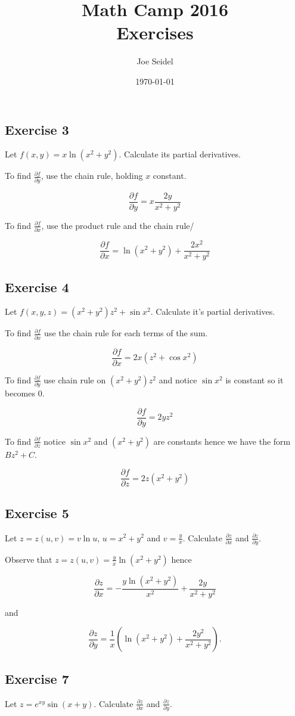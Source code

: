 \documentclass{tufte-book}
\title{Math Camp 2016\\Exercises }
\author{Joe Seidel}
\date{\today}
\newcommand{\pdv}[2]{\frac{\partial #1}{\partial #2}}
\theoremstyle{mytheoremstyle}
\theoremstyle{mylemstyle}
\theoremstyle{mydefstyle}
\begin{document}
\maketitle
{}
\newpage
{}

\subsection{Exercise 3}
Let $f(x,y) = x \ln(x^2 + y^2)$.  Calculate its partial derivatives.

To find $\pdv{f}{y}$, use the chain rule, holding $x$ constant.

\[ \pdv{f}{y} = x \frac{2y}{x^2 + y^2} \]

To find $\pdv{f}{x}$, use the product rule and the chain rule/

\[ \pdv{f}{x} = \ln(x^2+y^2) + \frac{2x^2}{x^2+y^2} \]

\subsection{Exercise 4}
Let $f(x,y,z) = (x^2 + y^2)z^2 + \sin x^2$.  Calculate it's partial derivatives.

To find $\pdv{f}{x}$ use the chain rule for each terms of the sum.

\[ \pdv{f}{x} = 2x(z^2 + \cos x^2) \]

To find $\pdv{f}{y}$ use chain rule on $(x^2+y^2)z^2$ and notice $\sin x^2$ is constant so it becomes $0$.

\[ \pdv{f}{y} = 2yz^2 \]

To find $\pdv{f}{z}$ notice $\sin x^2$ and $(x^2 + y^2)$ are constants hence we
have the form $Bz^2 + C$.

\[ \pdv{f}{z} = 2z(x^2+y^2) \]

\subsection{Exercise 5}
Let $z=z(u,v)= v \ln u$, $u=x^2+y^2$ and $v= \frac{y}{x}$.  Calculate $\pdv{z}{x}$ and $\pdv{z}{y}$.

Observe that $z = z(u,v) = \frac{y}{x} \ln (x^2 + y^2)$ hence

\[ \pdv{z}{x} = -\frac{y \ln(x^2+y^2)}{x^2} + \frac{2y}{x^2+y^2} \]

and

\[ \pdv{z}{y} = \frac{1}{x}(\ln(x^2+y^2) + \frac{2y^2}{x^2+y^2}). \]

\subsection{Exercise 7}
Let $z= e^{xy} \sin(x+y)$.  Calculate $\pdv{z}{x}$ and $\pdv{z}{y}$.
\end{document}
